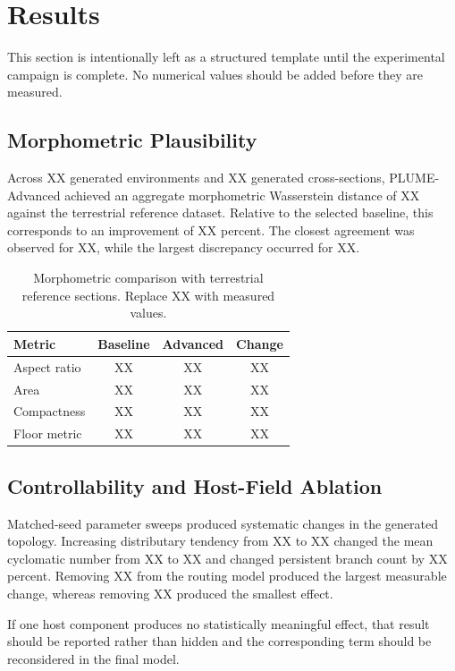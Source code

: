 \documentclass[conference]{IEEEtran}
\begin{document}
\section{Results}

This section is intentionally left as a structured template until the experimental campaign is complete. No numerical values should be added before they are measured.

\subsection{Morphometric Plausibility}

Across XX generated environments and XX generated cross-sections, PLUME-Advanced achieved an aggregate morphometric Wasserstein distance of XX against the terrestrial reference dataset. Relative to the selected baseline, this corresponds to an improvement of XX percent. The closest agreement was observed for XX, while the largest discrepancy occurred for XX.

\begin{table}[t]
\caption{Morphometric comparison with terrestrial reference sections. Replace XX with measured values.}
\label{tab:morph}
\centering
\small
\begin{tabular}{@{}lccc@{}}
\toprule
Metric & Baseline & Advanced & Change
\tabularnewline
\midrule
Aspect ratio & XX & XX & XX%
\tabularnewline
Area & XX & XX & XX%
\tabularnewline
Compactness & XX & XX & XX%
\tabularnewline
Floor metric & XX & XX & XX%
\tabularnewline
\bottomrule
\end{tabular}
\end{table}

\subsection{Controllability and Host-Field Ablation}

Matched-seed parameter sweeps produced systematic changes in the generated topology. Increasing distributary tendency from XX to XX changed the mean cyclomatic number from XX to XX and changed persistent branch count by XX percent. Removing XX from the routing model produced the largest measurable change, whereas removing XX produced the smallest effect.

If one host component produces no statistically meaningful effect, that result should be reported rather than hidden and the corresponding term should be reconsidered in the final model.
\end{document}
